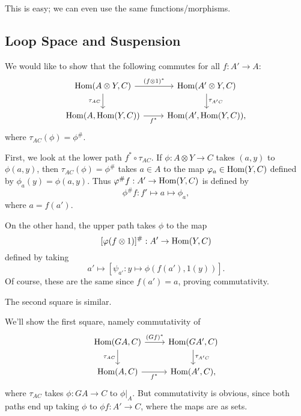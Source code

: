\documentclass[../../solutions.tex]{subfiles}
\begin{document}
\begin{exercise} \leavevmode
This is easy; we can even use the same functions/morphisms.
\end{exercise}

\subsection{Loop Space and Suspension}
\begin{exercise} \leavevmode
We would like to show that the following commutes for all $f:A'\to A$:
\[
\begin{tikzcd}
\Hom(A\otimes Y,C)\ar[r,"(f\otimes 1)^*"]\ar[d,"\tau_{AC}",swap] & \Hom(A'\otimes Y,C)\ar[d,"\tau_{A'C}"] \\
\Hom(A,\Hom(Y,C))\ar[r,"f^*",swap] & \Hom(A',\Hom(Y,C)),
\end{tikzcd}
\]
where $\tau_{AC}(\phi)=\phi^\#$.

First, we look at the lower path $f^*\circ\tau_{AC}$.
If $\phi:A\otimes Y\to C$ takes $(a,y)$ to $\phi(a,y)$, then $\tau_{AC}(\phi)=\phi^\#$ takes $a\in A$ to the map $\varphi_a\in\operatorname{Hom}(Y,C)$ defined by $\phi_a(y)=\phi(a,y)$.
Thus $\varphi^\#f:A'\to\operatorname{Hom}(Y,C)$ is defined by
\[\phi^\#f:f'\mapsto a\mapsto\phi_a,\]
where $a=f(a')$.

On the other hand, the upper path takes $\phi$ to the map
\[[\varphi(f\otimes 1)]^\#:A'\to\operatorname{Hom}(Y,C)\]
defined by taking
\[a'\mapsto[\psi_{a'}:y\mapsto\phi(f(a'),1(y))].\]
Of course, these are the same since $f(a')=a$, proving commutativity.

The second square is similar.
\end{exercise}

\begin{exercise} \leavevmode
We'll show the first square, namely commutativity of
\[
\begin{tikzcd}
\Hom(GA,C)\ar[r,"(Gf)^*"]\ar[d,"\tau_{AC}",swap] & \Hom(GA',C)\ar[d,"\tau_{A'C}"] \\
\Hom(A,C)\ar[r,"f^*",swap] & \Hom(A',C),
\end{tikzcd}
\]
where $\tau_{AC}$ takes $\phi:GA\to C$ to $\phi|_A$.
But commutativity is obvious, since both paths end up taking $\phi$ to $\phi f:A'\to C$, where the maps are as sets.
\end{exercise}
\end{document}
